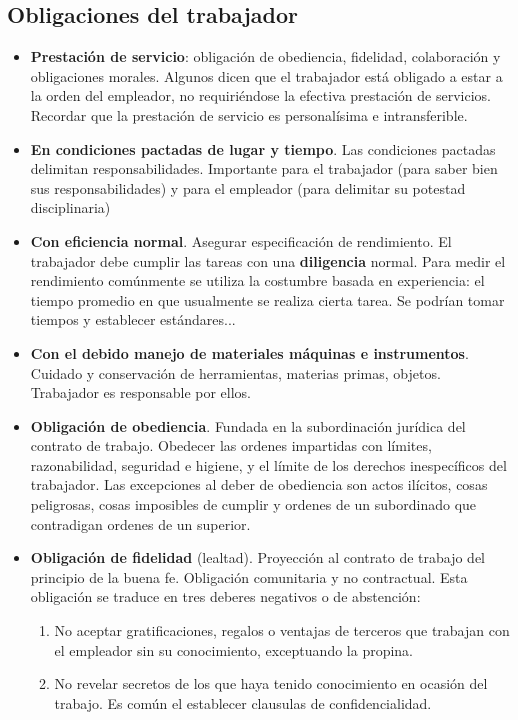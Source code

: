 \documentclass[spanish,12pt,a4paper,titlepage]{report}
\begin{document}
\subsection{Obligaciones del trabajador}
\begin{itemize}
	\item \textbf{Prestación de servicio}: obligación de obediencia, fidelidad, colaboración y obligaciones morales. Algunos dicen que el trabajador está obligado a estar a la orden del empleador, no requiriéndose la efectiva prestación de servicios. Recordar que la prestación de servicio es personalísima e intransferible.
	\item \textbf{En condiciones pactadas de lugar y tiempo}. Las condiciones pactadas delimitan responsabilidades. Importante para el trabajador (para saber bien sus responsabilidades) y para el empleador (para delimitar su potestad disciplinaria)
	\item \textbf{Con eficiencia normal}. Asegurar especificación de rendimiento. El trabajador debe cumplir las tareas con una \textbf{diligencia} normal. Para medir el rendimiento comúnmente se utiliza la costumbre basada en experiencia: el tiempo promedio en que usualmente se realiza cierta tarea. Se podrían tomar tiempos y establecer estándares...
	\item \textbf{Con el debido manejo de materiales máquinas e instrumentos}. Cuidado y conservación de herramientas, materias primas, objetos. Trabajador es responsable por ellos.
	\item \textbf{Obligación de obediencia}. Fundada en la subordinación  jurídica del contrato de trabajo. Obedecer las ordenes impartidas con límites, razonabilidad, seguridad e higiene, y el límite de los derechos inespecíficos del trabajador. Las excepciones al deber de obediencia son actos ilícitos, cosas peligrosas, cosas imposibles de cumplir y ordenes de un subordinado que contradigan ordenes de un superior.
	
	\item \textbf{Obligación de fidelidad} (lealtad). Proyección al contrato de trabajo del principio de la buena fe. Obligación comunitaria y no contractual.
	Esta obligación se traduce en tres deberes negativos o de abstención: 
	\begin{enumerate}
		\item No aceptar gratificaciones, regalos o ventajas de terceros que trabajan con el empleador sin su conocimiento, exceptuando la propina.
		\item No revelar secretos de los que haya tenido conocimiento en ocasión del trabajo. Es común el establecer clausulas de confidencialidad.


\end{enumerate}
\end{itemize}
\end{document}
